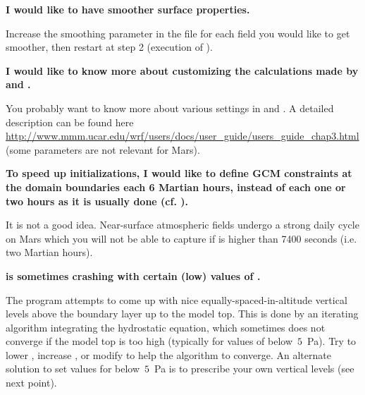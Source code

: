 \sk
\noindent \textbf{I would like to have smoother surface properties.}
\begin{finger}
\item Increase the smoothing parameter  in the file  for each field you would like to get smoother, then restart at step 2 (execution of ).
\end{finger}

\sk
\noindent \textbf{I would like to know more about customizing the calculations made by  and .}
\begin{finger}
\item You probably want to know more about various settings in  and . A detailed description can be found here \url{http://www.mmm.ucar.edu/wrf/users/docs/user_guide/users_guide_chap3.html} (some parameters are not relevant for Mars).
\end{finger}

\sk
\noindent \textbf{To speed up initializations, I would like to define GCM constraints at the domain boundaries each 6 Martian hours, instead of each one or two hours as it is usually done (cf. ).}
\begin{finger}
\item It is not a good idea. Near-surface atmospheric fields undergo a strong daily cycle on Mars which you will not be able to capture if  is higher than 7400 seconds (i.e. two Martian hours).
\end{finger}

\sk
\noindent \textbf{ is sometimes crashing with certain (low) values of .}
\begin{finger}
\item The program  attempts to come up with nice equally-spaced-in-altitude vertical levels above the boundary layer up to the model top. This is done by an iterating algorithm integrating the hydrostatic equation, which sometimes does not converge if the model top is too high (typically for values of  below~$5$~Pa). Try to lower , increase , or modify  to help the algorithm to converge. An alternate solution to set values for  below~$5$~Pa is to prescribe your own vertical levels (see next point).
\end{finger}

